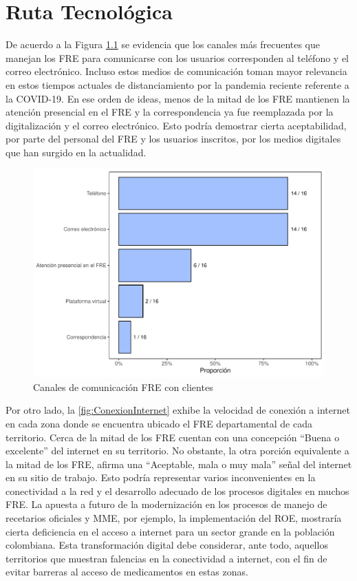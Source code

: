 \documentclass[
]{book}
\begin{document}
\hypertarget{ruta-tecnoluxf3gica}{%
\chapter{Ruta Tecnológica}\label{ruta-tecnoluxf3gica}}


De acuerdo a la Figura \ref{fig:MediosComunicacion} se evidencia que los canales más frecuentes que manejan los FRE para comunicarse con los usuarios corresponden al teléfono y el correo electrónico. Incluso estos medios de comunicación toman mayor relevancia en estos tiempos actuales de distanciamiento por la pandemia reciente referente a la COVID-19. En ese orden de ideas, menos de la mitad de los FRE mantienen la atención presencial en el FRE y la correspondencia ya fue reemplazada por la digitalización y el correo electrónico. Esto podría demostrar cierta aceptabilidad, por parte del personal del FRE y los usuarios inscritos, por los medios digitales que han surgido en la actualidad.

\begin{figure}
\includegraphics[width=0.85\linewidth]{InformeFinal_files/figure-latex/MediosComunicacion-1} \caption{Canales de comunicación FRE con clientes}\label{fig:MediosComunicacion}
\end{figure}

Por otro lado, la \ref{fig:ConexionInternet} exhibe la velocidad de conexión a internet en cada zona donde se encuentra ubicado el FRE departamental de cada territorio. Cerca de la mitad de los FRE cuentan con una concepción ``Buena o excelente'' del internet en su territorio. No obstante, la otra porción equivalente a la mitad de los FRE, afirma una ``Aceptable, mala o muy mala'' señal del internet en su sitio de trabajo. Esto podría representar varios inconvenientes en la conectividad a la red y el desarrollo adecuado de los procesos digitales en muchos FRE. La apuesta a futuro de la modernización en los procesos de manejo de recetarios oficiales y MME, por ejemplo, la implementación del ROE, mostraría cierta deficiencia en el acceso a internet para un sector grande en la población colombiana. Esta transformación digital debe considerar, ante todo, aquellos territorios que muestran falencias en la conectividad a internet, con el fin de evitar barreras al acceso de medicamentos en estas zonas.
\end{document}
